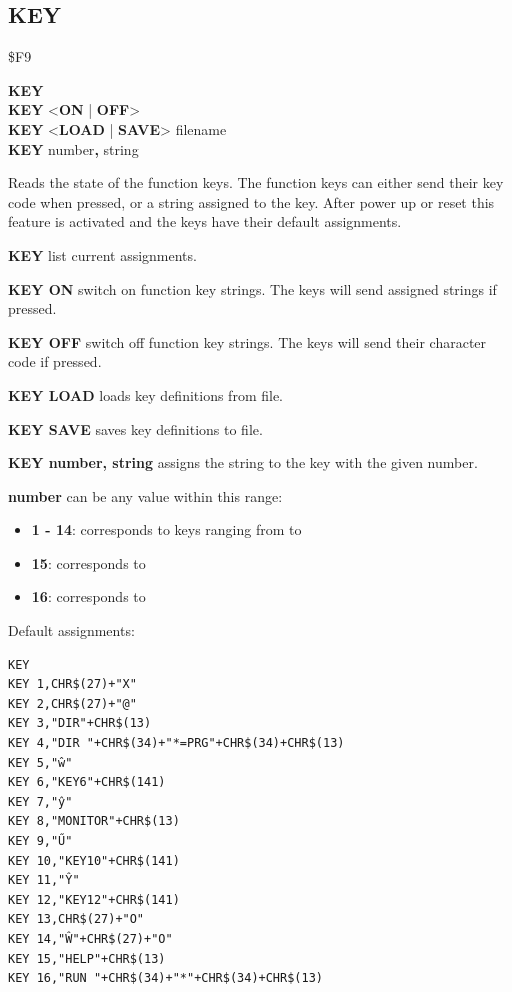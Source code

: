\subsection{KEY}
\begin{description}[leftmargin=2cm,style=nextline]
\item [Token:] \$F9
\item [Format:] {\bf KEY} \\
		{\bf KEY} <{\bf ON} | {\bf OFF}> \\
		{\bf KEY} <{\bf LOAD} | {\bf SAVE}> filename \\
		{\bf KEY} number{\bf,} string
\item [Usage:] Reads the state of the function keys.
               The function keys can either send their key code
               when pressed, or a string assigned to the key.
               After power up or reset this feature is activated
               and the keys have their default assignments.

               {\bf KEY} list current assignments.

               {\bf KEY ON} switch on function key strings.
               The keys will send assigned strings if pressed.

               {\bf KEY OFF} switch off function key strings.
               The keys will send their character code if pressed.

               {\bf KEY LOAD} loads key definitions from file.

               {\bf KEY SAVE} saves key definitions to file.

               {\bf KEY number, string} assigns the string to
               the key with the given number.

               {\bf number} can be any value within this range:

                \begin{itemize}
                    \item {\bf 1 - 14}: corresponds to keys ranging from  to 
                    \item {\bf 15}: corresponds to 
                    \item {\bf 16}: corresponds to 
                \end{itemize}

               Default assignments:

\begin{tcolorbox}[colback=black,coltext=white]
\verbatimfont{\codefont}
\begin{verbatim}
KEY
KEY 1,CHR$(27)+"X"
KEY 2,CHR$(27)+"@"
KEY 3,"DIR"+CHR$(13)
KEY 4,"DIR "+CHR$(34)+"*=PRG"+CHR$(34)+CHR$(13)
KEY 5,"ŵ"
KEY 6,"KEY6"+CHR$(141)
KEY 7,"ŷ"
KEY 8,"MONITOR"+CHR$(13)
KEY 9,"Ű"
KEY 10,"KEY10"+CHR$(141)
KEY 11,"Ŷ"
KEY 12,"KEY12"+CHR$(141)
KEY 13,CHR$(27)+"O"
KEY 14,"Ŵ"+CHR$(27)+"O"
KEY 15,"HELP"+CHR$(13)
KEY 16,"RUN "+CHR$(34)+"*"+CHR$(34)+CHR$(13)
\end{verbatim}
\end{tcolorbox}


\end{description}
